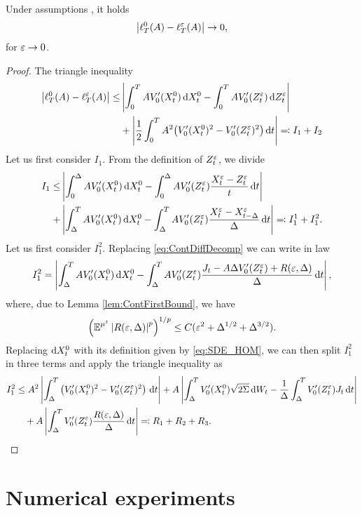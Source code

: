 \documentclass[10pt]{article}
\begin{document}
\begin{lemma} Under assumptions , it holds
	\begin{equation}
		\left\lvert\ell_T^0(A) - \ell_T^\varepsilon(A)\right\rvert \to 0,
	\end{equation}
	for $\varepsilon \to 0$.
\end{lemma}

\begin{proof} The triangle inequality
	\begin{equation}
	\begin{aligned}
		\left\lvert\ell_T^0(A) - \ell_T^\varepsilon(A)\right\rvert \leq &\left\lvert\int_0^T A V_0'(X_t^0) \,\mathrm{d} X_t^0 - \int_0^T A V_0'(Z^\varepsilon_t) \,\mathrm{d} Z^\varepsilon_t\right\rvert \\
		&+ \left\lvert\frac12 \int_0^T A^2 \big(V_0'(X_t^0)^2 - V_0'(Z^\varepsilon_t)^2\big) \,\mathrm{d} t\right\rvert \eqqcolon I_1 + I_2
	\end{aligned}
	\end{equation}
	Let us first consider $I_1$. From the definition of $Z_t^\varepsilon$, we divide
	\begin{equation}
	\begin{aligned}
		 I_1 \leq &\left\lvert\int_0^\Delta A V_0'(X_t^0) \,\mathrm{d} X_t^0 - \int_0^\Delta A V_0'(Z^\varepsilon_t) \frac{X^\varepsilon_t - Z^\varepsilon_t}{t}\,\mathrm{d} t\right\rvert\\
		 + &\left\lvert\int_\Delta^T A V_0'(X_t^0) \,\mathrm{d} X_t^0 - \int_\Delta^T A V_0'(Z^\varepsilon_t) \frac{X^\varepsilon_t - X^\varepsilon_{t-\Delta}}{\Delta}\,\mathrm{d} t\right\rvert \eqqcolon I_1^1 + I_1^2.
	\end{aligned} 
	\end{equation}
	Let us first consider $I_1^2$. Replacing \eqref{eq:ContDiffDecomp} we can write in law
	\begin{equation}
		I_1^2 = \left\lvert\int_\Delta^T A V_0'(X_t^0) \,\mathrm{d} X_t^0 - \int_\Delta^T A V_0'(Z^\varepsilon_t) \frac{J_t - A\Delta V_0'(Z_t^\varepsilon) + R(\varepsilon, \Delta)}{\Delta}\,\mathrm{d} t\right\rvert,
	\end{equation}
	where, due to Lemma \ref{lem:ContFirstBound}, we have
	\begin{equation}
		\left( \operatorname{\mathbb{E}}^{\mu^\varepsilon} \left\lvert R(\varepsilon, \Delta)\right\rvert^p \right)^{1/p} \leq C(\varepsilon^2 + \Delta^{1/2} + \Delta^{3/2}).
	\end{equation}
	Replacing $\mathrm{d} X^0_t$ with its definition given by \eqref{eq:SDE_HOM}, we can then split $I_1^2$ in three terms and apply the triangle inequality as
	\begin{equation}
	\begin{aligned}
		I_1^2 &\leq A^2 \left\lvert\int_\Delta^T  \left(V_0'(X_t^0)^2 - V_0'(Z_t^\varepsilon)^2\right) \,\mathrm{d} t\right\rvert + A \left\lvert\int_\Delta^T  V_0'(X^0_t)\sqrt{2\Sigma}\,\mathrm{d} W_t - \frac{1}{\Delta} \int_\Delta^T V_0'(Z_t^\varepsilon) J_t \,\mathrm{d} t\right\rvert \\
		&\quad+ A \left\lvert\int_\Delta^T V_0'(Z_t^\varepsilon) \frac{R(\varepsilon, \Delta)}{\Delta}\,\mathrm{d} t\right\rvert \eqqcolon R_1 + R_2 + R_3.
	\end{aligned}
	\end{equation}	
\end{proof}

\section{Numerical experiments}



\end{document}
